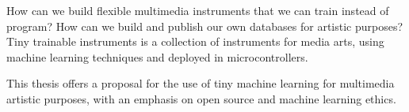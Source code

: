 % 
%
%
How can we build flexible multimedia instruments that we can train instead of program? How can we build and publish our own databases for artistic purposes? Tiny trainable instruments is a collection of instruments for media arts, using machine learning techniques and deployed in microcontrollers.

This thesis offers a proposal for the use of tiny machine learning for multimedia artistic purposes, with an emphasis on open source and machine learning ethics.
